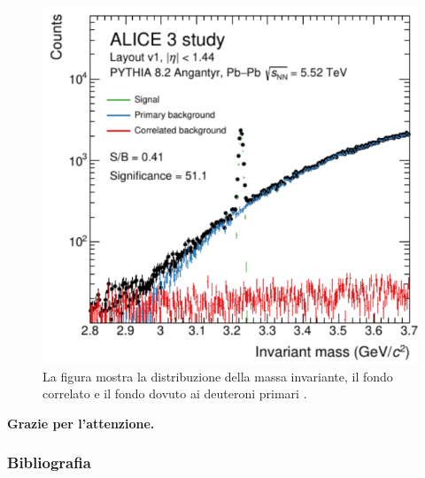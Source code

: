\documentclass[11pt]{beamer}
\begin{document}
	\begin{frame}		
		\begin{figure}		
			\centering
			\includegraphics[width=0.5\linewidth]{pictures/ALICE_c-d_detection_2.png}
			\caption{La figura mostra la distribuzione della massa invariante, il fondo correlato e il fondo dovuto ai deuteroni primari \cite{alicecollaboration2022letterintentalice3}.}
			\label{fig:QCD_vertices} 
		\end{figure}
	\end{frame}
	
	\begin{frame}
		\centering
		\Huge{\textbf{Grazie per l'attenzione.}}\\[2ex]
	\end{frame}
	
	\begin{frame}
		\frametitle{Bibliografia}
		\printbibliography
	\end{frame}
	
	
	
\end{document}
